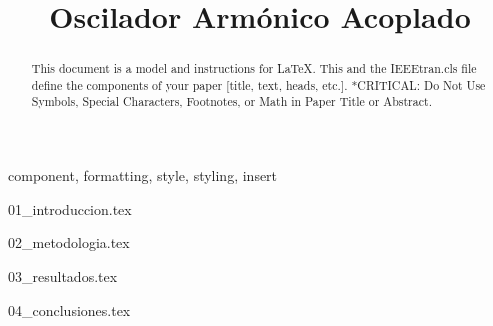 \documentclass[conference]{IEEEtran}
\begin{document}
\title{Oscilador Armónico Acoplado}

\author{
}
	
\maketitle
	
\begin{abstract}
	This document is a model and instructions for \LaTeX.
	This and the IEEEtran.cls file define the components of your paper [title, text, heads, etc.]. *CRITICAL: Do Not Use Symbols, Special Characters, Footnotes, 
	or Math in Paper Title or Abstract.
\end{abstract}
	
\begin{IEEEkeywords}
	component, formatting, style, styling, insert
\end{IEEEkeywords}
	
{01_introduccion.tex}
	
{02_metodologia.tex}
	
{03_resultados.tex}
	
{04_conclusiones.tex}

	
\renewcommand{\refname}{Referencias}


	
\end{document}
